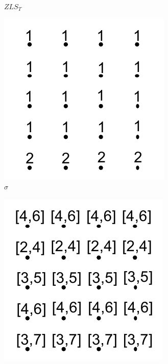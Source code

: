 \begin{figure}[!t]
\begin{subfigure}{0.243\linewidth}
\vspace{-5mm}
\caption{$ZLS_{T}$}
\label{fig:zlsT}
\end{subfigure}
\begin{subfigure}{0.243\linewidth}
\includegraphics[width=\linewidth]{Images/sigma.pdf}
\vspace{-5mm}
\caption{${\sigma}$}
\label{fig:sigma}
\end{subfigure}
\begin{subfigure}{0.243\linewidth}
\includegraphics[width=\linewidth]{Images/boundsC.pdf}

\end{subfigure}
\end{figure}
